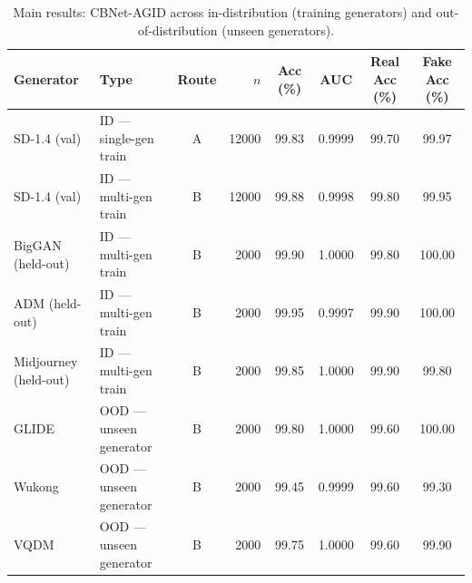 \begin{table}[h]
\centering
\caption{Main results: CBNet-AGID across in-distribution (training generators) and out-of-distribution (unseen generators).}
\label{tab:main}
\begin{tabular}{llcrcccc}
\toprule
Generator & Type & Route & $n$ & Acc (\%) & AUC & Real Acc (\%) & Fake Acc (\%) \\
\midrule
SD-1.4 (val) & ID — single-gen train & A & 12000 & 99.83 & 0.9999 & 99.70 & 99.97 \\
SD-1.4 (val) & ID — multi-gen train & B & 12000 & 99.88 & 0.9998 & 99.80 & 99.95 \\
BigGAN (held-out) & ID — multi-gen train & B & 2000 & 99.90 & 1.0000 & 99.80 & 100.00 \\
ADM (held-out) & ID — multi-gen train & B & 2000 & 99.95 & 0.9997 & 99.90 & 100.00 \\
Midjourney (held-out) & ID — multi-gen train & B & 2000 & 99.85 & 1.0000 & 99.90 & 99.80 \\
GLIDE & OOD — unseen generator & B & 2000 & 99.80 & 1.0000 & 99.60 & 100.00 \\
Wukong & OOD — unseen generator & B & 2000 & 99.45 & 0.9999 & 99.60 & 99.30 \\
VQDM & OOD — unseen generator & B & 2000 & 99.75 & 1.0000 & 99.60 & 99.90 \\
\bottomrule
\end{tabular}
\end{table}